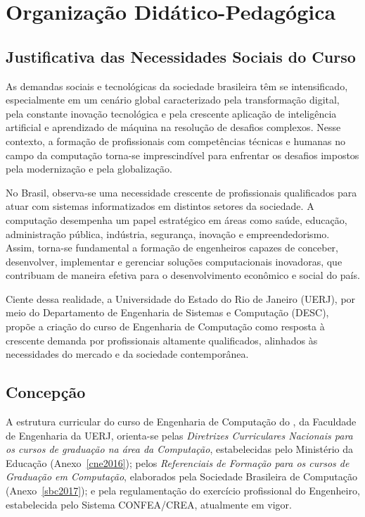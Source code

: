 \chapter{Organização Didático-Pedagógica}

\section{Justificativa das Necessidades Sociais do Curso}

As demandas sociais e tecnológicas da sociedade brasileira têm se intensificado, especialmente em um cenário global caracterizado pela transformação digital, pela constante inovação tecnológica e pela crescente aplicação de inteligência artificial e aprendizado de máquina na resolução de desafios complexos. Nesse contexto, a formação de profissionais com competências técnicas e humanas no campo da computação torna-se imprescindível para enfrentar os desafios impostos pela modernização e pela globalização.

No Brasil, observa-se uma necessidade crescente de profissionais qualificados para atuar com sistemas informatizados em distintos setores da sociedade. A computação desempenha um papel estratégico em áreas como saúde, educação, administração pública, indústria, segurança, inovação e empreendedorismo. Assim, torna-se fundamental a formação de engenheiros capazes de conceber, desenvolver, implementar e gerenciar soluções computacionais inovadoras, que contribuam de maneira efetiva para o desenvolvimento econômico e social do país.

Ciente dessa realidade, a Universidade do Estado do Rio de Janeiro (UERJ), por meio do Departamento de Engenharia de Sistemas e Computação (DESC), propõe a criação do curso de Engenharia de Computação como resposta à crescente demanda por profissionais altamente qualificados, alinhados às necessidades do mercado e da sociedade contemporânea.

\section{Concepção}

A estrutura curricular do curso de Engenharia de Computação do \desc, da Faculdade de Engenharia da UERJ, orienta-se pelas \textit{Diretrizes Curriculares Nacionais para os cursos de graduação na área da Computação}, estabelecidas pelo Ministério da Educação (Anexo~\ref{cne2016}); pelos \textit{Referenciais de Formação para os cursos de Graduação em Computação}, elaborados pela Sociedade Brasileira de Computação (Anexo~\ref{sbc2017}); e pela regulamentação do exercício profissional do Engenheiro, estabelecida pelo Sistema CONFEA/CREA, atualmente em vigor.

